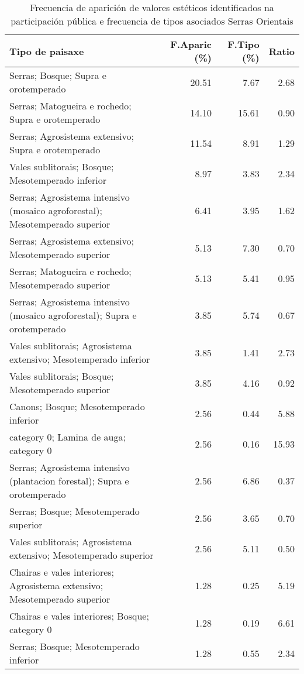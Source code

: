 \begin{table}[p]
\centering
\caption{Frecuencia de aparición de valores estéticos identificados na participación pública e frecuencia de tipos asociados Serras Orientais} 
\label{vsixotest5}
\begin{tabular}{lrrr}
  \hline
Tipo de paisaxe & F.Aparic (\%) & F.Tipo (\%) & Ratio \\ 
  \hline
Serras; Bosque; Supra e orotemperado & 20.51 & 7.67 & 2.68 \\ 
  Serras; Matogueira e rochedo; Supra e orotemperado & 14.10 & 15.61 & 0.90 \\ 
  Serras; Agrosistema extensivo; Supra e orotemperado & 11.54 & 8.91 & 1.29 \\ 
  Vales sublitorais; Bosque; Mesotemperado inferior & 8.97 & 3.83 & 2.34 \\ 
  Serras; Agrosistema intensivo (mosaico agroforestal); Mesotemperado superior & 6.41 & 3.95 & 1.62 \\ 
  Serras; Agrosistema extensivo; Mesotemperado superior & 5.13 & 7.30 & 0.70 \\ 
  Serras; Matogueira e rochedo; Mesotemperado superior & 5.13 & 5.41 & 0.95 \\ 
  Serras; Agrosistema intensivo (mosaico agroforestal); Supra e orotemperado & 3.85 & 5.74 & 0.67 \\ 
  Vales sublitorais; Agrosistema extensivo; Mesotemperado inferior & 3.85 & 1.41 & 2.73 \\ 
  Vales sublitorais; Bosque; Mesotemperado superior & 3.85 & 4.16 & 0.92 \\ 
  Canons; Bosque; Mesotemperado inferior & 2.56 & 0.44 & 5.88 \\ 
  category 0; Lamina de auga; category 0 & 2.56 & 0.16 & 15.93 \\ 
  Serras; Agrosistema intensivo (plantacion forestal); Supra e orotemperado & 2.56 & 6.86 & 0.37 \\ 
  Serras; Bosque; Mesotemperado superior & 2.56 & 3.65 & 0.70 \\ 
  Vales sublitorais; Agrosistema extensivo; Mesotemperado superior & 2.56 & 5.11 & 0.50 \\ 
  Chairas e vales interiores; Agrosistema extensivo; Mesotemperado superior & 1.28 & 0.25 & 5.19 \\ 
  Chairas e vales interiores; Bosque; category 0 & 1.28 & 0.19 & 6.61 \\ 
  Serras; Bosque; Mesotemperado inferior & 1.28 & 0.55 & 2.34 \\ 
   \hline
\end{tabular}
\end{table}
